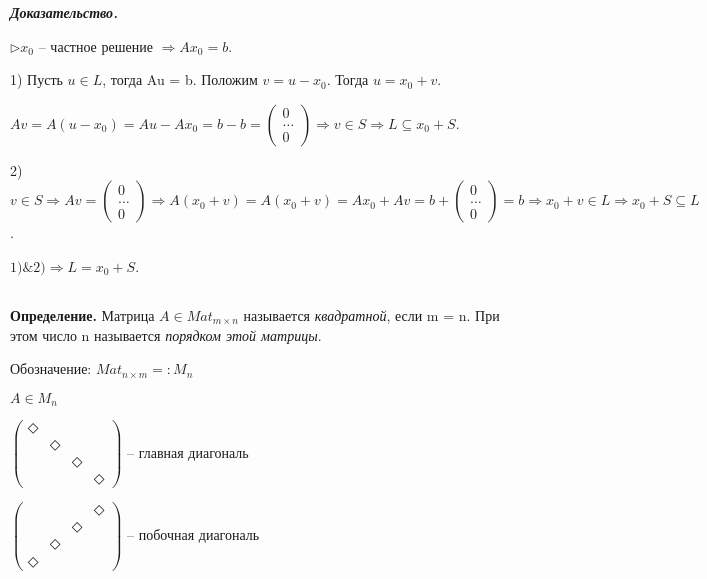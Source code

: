 \vspace{\baselineskip}
\textbf{\textit{Доказательство.}}

$\rhd x_0$ -- частное решение $\Rightarrow Ax_0 = b$.

1) Пусть $u \in L$, тогда Au = b. Положим $v = u - x_0$. Тогда $u = x_0 + v$.

$Av = A(u - x_0) = Au - Ax_0 = b - b = \begin{pmatrix} 0 \\ \dots \\ 0  \end{pmatrix} \Rightarrow v \in S \Rightarrow L \subseteq x_0 + S$.

2) $v \in S \Rightarrow Av = \begin{pmatrix} 0 \\ \dots \\ 0  \end{pmatrix} \Rightarrow A(x_0 + v) = A(x_0 + v) = Ax_0 + Av = b + \begin{pmatrix} 0 \\ \dots \\ 0  \end{pmatrix} = b \Rightarrow x_0 + v \in L \Rightarrow x_0 + S \subseteq L$.

$1) \& 2) \Rightarrow L = x_0 + S$.

\subsection{}
\vspace{\baselineskip}
\textbf{Определение.} Матрица $A \in Mat_{m \times n}$ называется \textit{квадратной}, если m = n. При этом число n называется \textit{порядком этой матрицы}.

Обозначение: $Mat_{n \times m} =: M_n$

\vspace{\baselineskip}
$A \in M_n$ 

$ \begin{pmatrix} \Diamond & & & \\ & \Diamond & & \\ & & \Diamond & \\ & & & \Diamond \end{pmatrix} $ -- главная диагональ


$ \begin{pmatrix} & & & \Diamond \\ & & \Diamond & \\ & \Diamond & & \\ \Diamond & & & \end{pmatrix} $ -- побочная диагональ

